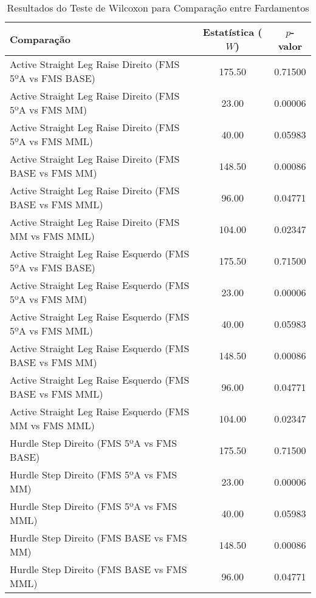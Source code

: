         \begin{table}[H]
            \centering
            \caption{Resultados do Teste de Wilcoxon para Comparação entre Fardamentos}
            \label{tab:wilcoxon}
            \begin{tabular}{lcc}
                \hline
                \textbf{Comparação} & \textbf{Estatística ($W$)} & \textbf{$p$-valor} \\
                \hline
                Active Straight Leg Raise Direito (FMS 5ºA vs FMS BASE) & 175.50 & 0.71500 \\
                Active Straight Leg Raise Direito (FMS 5ºA vs FMS MM) & 23.00 & 0.00006 \\
                Active Straight Leg Raise Direito (FMS 5ºA vs FMS MML) & 40.00 & 0.05983 \\
                Active Straight Leg Raise Direito (FMS BASE vs FMS MM) & 148.50 & 0.00086 \\
                Active Straight Leg Raise Direito (FMS BASE vs FMS MML) & 96.00 & 0.04771 \\
                Active Straight Leg Raise Direito (FMS MM vs FMS MML) & 104.00 & 0.02347 \\
                Active Straight Leg Raise Esquerdo (FMS 5ºA vs FMS BASE) & 175.50 & 0.71500 \\
                Active Straight Leg Raise Esquerdo (FMS 5ºA vs FMS MM) & 23.00 & 0.00006 \\
                Active Straight Leg Raise Esquerdo (FMS 5ºA vs FMS MML) & 40.00 & 0.05983 \\
                Active Straight Leg Raise Esquerdo (FMS BASE vs FMS MM) & 148.50 & 0.00086 \\
                Active Straight Leg Raise Esquerdo (FMS BASE vs FMS MML) & 96.00 & 0.04771 \\
                Active Straight Leg Raise Esquerdo (FMS MM vs FMS MML) & 104.00 & 0.02347 \\
                Hurdle Step Direito (FMS 5ºA vs FMS BASE) & 175.50 & 0.71500 \\
                Hurdle Step Direito (FMS 5ºA vs FMS MM) & 23.00 & 0.00006 \\
                Hurdle Step Direito (FMS 5ºA vs FMS MML) & 40.00 & 0.05983 \\
                Hurdle Step Direito (FMS BASE vs FMS MM) & 148.50 & 0.00086 \\
                Hurdle Step Direito (FMS BASE vs FMS MML) & 96.00 & 0.04771 \\

\end{tabular}
\end{table}
